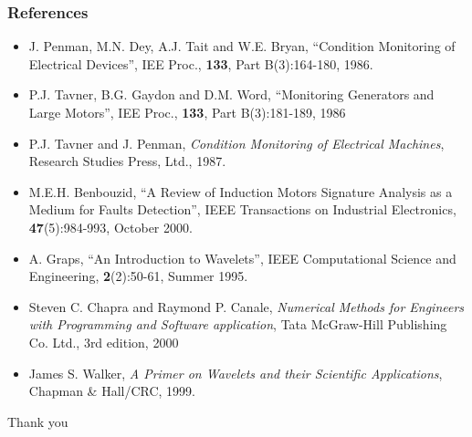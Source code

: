 \documentclass[9pt]{beamer}
\begin{document}
\begin{frame}
\frametitle{References}

\begin{itemize} 
    \item J. Penman, M.N. Dey, A.J. Tait and W.E. Bryan, ``Condition Monitoring of Electrical Devices'', IEE Proc., \textbf{133}, Part B(3):164-180, 1986.
    \item P.J. Tavner, B.G. Gaydon and D.M. Word, ``Monitoring Generators and Large Motors'', IEE Proc., \textbf{133}, Part B(3):181-189, 1986
    \item P.J. Tavner and J. Penman, \emph{Condition Monitoring of Electrical Machines}, Research Studies Press, Ltd., 1987.
    \item M.E.H. Benbouzid, ``A Review of Induction Motors Signature Analysis as a Medium  for  Faults  Detection'',  IEEE  Transactions on Industrial Electronics, \textbf{47}(5):984-993, October 2000.
    \item A. Graps, ``An Introduction to Wavelets'', IEEE Computational Science and Engineering, \textbf{2}(2):50-61, Summer 1995.
    \item Steven C. Chapra and Raymond P. Canale, \emph{Numerical Methods for Engineers with Programming and Software application}, Tata McGraw-Hill Publishing Co. Ltd., 3rd edition, 2000
    \item James S. Walker, \emph{A Primer on Wavelets and their Scientific Applications}, Chapman \& Hall/CRC, 1999.
\end{itemize}
\end{frame}

\begin{frame}
\begin{center}
\LARGE{Thank you}
\end{center}
\end{frame}
\end{document}
